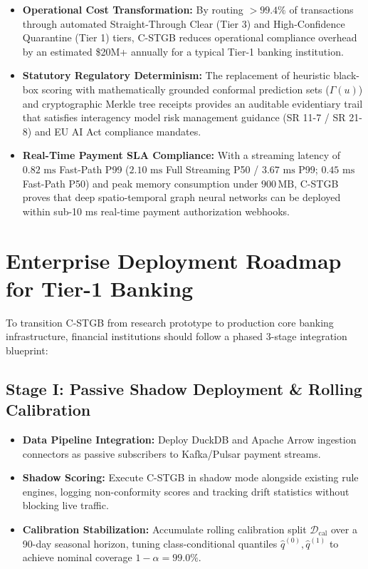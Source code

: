 \begin{itemize}
    \item \textbf{Operational Cost Transformation:} By routing $>99.4\%$ of transactions through automated Straight-Through Clear (Tier 3) and High-Confidence Quarantine (Tier 1) tiers, C-STGB reduces operational compliance overhead by an estimated \$20M+ annually for a typical Tier-1 banking institution.
    \item \textbf{Statutory Regulatory Determinism:} The replacement of heuristic black-box scoring with mathematically grounded conformal prediction sets ($\Gamma(u)$) and cryptographic Merkle tree receipts provides an auditable evidentiary trail that satisfies interagency model risk management guidance (SR 11-7 / SR 21-8) and EU AI Act compliance mandates.
    \item \textbf{Real-Time Payment SLA Compliance:} With a streaming latency of $0.82\text{ ms}$ Fast-Path P99 ($2.10\text{ ms}$ Full Streaming P50 / $3.67\text{ ms}$ P99; $0.45\text{ ms}$ Fast-Path P50) and peak memory consumption under $900\,\text{MB}$, C-STGB proves that deep spatio-temporal graph neural networks can be deployed within sub-10 ms real-time payment authorization webhooks.
\end{itemize}

\section{Enterprise Deployment Roadmap for Tier-1 Banking}
To transition C-STGB from research prototype to production core banking infrastructure, financial institutions should follow a phased 3-stage integration blueprint:

\subsection{Stage I: Passive Shadow Deployment \& Rolling Calibration}
\begin{itemize}
    \item \textbf{Data Pipeline Integration:} Deploy DuckDB and Apache Arrow ingestion connectors as passive subscribers to Kafka/Pulsar payment streams.
    \item \textbf{Shadow Scoring:} Execute C-STGB in shadow mode alongside existing rule engines, logging non-conformity scores and tracking drift statistics without blocking live traffic.
    \item \textbf{Calibration Stabilization:} Accumulate rolling calibration split $\mathcal{D}_{\text{cal}}$ over a 90-day seasonal horizon, tuning class-conditional quantiles $\hat{q}^{(0)}, \hat{q}^{(1)}$ to achieve nominal coverage $1-\alpha = 99.0\%$.
\end{itemize}

